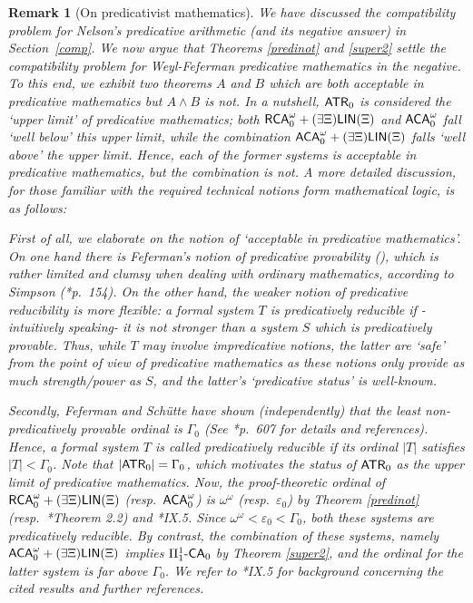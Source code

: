 \documentclass[reqno]{amsart}
\newtheorem{rem}[thm]{Remark}
\def\FIVE{\Pi_{1}^{1}\text{-\textup{\textsf{CA}}}_{0}}
\def\ATR{\textup{\textsf{ATR}}}
\def\RCAo{\textup{\textsf{RCA}}_{0}^{\omega}}
\def\ACAo{\textup{\textsf{ACA}}_{0}^{\omega}}
\def\LIN{\textup{\textsf{LIN}}}
\def\eps{\varepsilon}
\numberwithin{equation}{section}
\numberwithin{thm}{section}
\begin{document}
\begin{rem}[On predicativist mathematics]\label{predifiel}\rm
We have discussed the \emph{compatibility problem} for Nelson's predicative arithmetic (and its negative answer) in Section~\ref{comp}.  
We now argue that Theorems \ref{predinot} and \ref{super2} settle the compatibility problem for Weyl-Feferman predicative mathematics \emph{in the negative}.  
To this end, we exhibit two theorems $A$ and $B$ which are both \emph{acceptable} in predicative mathematics but $A\wedge B$ is not.  
In a nutshell, $\ATR_{0}$ is considered the `upper limit' of predicative mathematics; both $\RCAo+(\exists \Xi)\LIN(\Xi)$ and $\ACAo$ fall `well below' this upper limit, while the combination $\ACAo+(\exists \Xi)\LIN(\Xi)$ falls `well above' the upper limit.  Hence, each of the former systems is acceptable in predicative mathematics, but the combination is not.  
A more detailed discussion, for those familiar with the required technical notions form mathematical logic, is as follows:  

\smallskip

First of all, we elaborate on the notion of `acceptable in predicative mathematics'.
On one hand there is Feferman's notion of \emph{predicative provability} (\cite{fefermanga, fefermanmain}), 
which is rather limited and clumsy when dealing with ordinary mathematics, according to Simpson (\cite{simpsonfriedman}*{p.\ 154}).
On the other hand, the weaker notion of \emph{predicative reducibility} is more flexible: a formal system $T$ is \emph{predicatively reducible} 
if -intuitively speaking- it is not stronger than a system $S$ which is predicatively provable.  
Thus, while $T$ may involve \emph{impredicative} notions, the latter are `safe' from the point of view of predicative mathematics as these notions only provide as much strength/power as $S$, and the latter's `predicative status' is well-known.    

\smallskip

Secondly, Feferman and Sch\"utte have shown (independently) that the least \emph{non-predicatively provable} ordinal is $\Gamma_{0}$ (See \cite{fefermanmain}*{p.\ 607} for details and references).  Hence, a formal system $T$ is called \emph{predicatively reducible} if its ordinal $|T|$ satisfies $|T|<\Gamma_{0}$.   
Note that $|\ATR_{0}|=\Gamma_{0}$, which motivates the status of $\ATR_{0}$ as the upper limit of predicative mathematics.  
Now, the proof-theoretic ordinal of $\RCAo+(\exists \Xi)\LIN(\Xi)$ (resp.\ $\ACAo$) is $\omega^{\omega}$ (resp.\ $\eps_{0}$) by Theorem \ref{predinot} (resp.\ \cite{yamayamaharehare}*{Theorem 2.2}) and \cite{simpson2}*{IX.5}.
Since $\omega^{\omega}<\eps_{0}<\Gamma_{0}$, both these systems are predicatively reducible.  
By contrast, the combination of these systems, namely $\ACAo+(\exists \Xi)\LIN(\Xi)$ implies $\FIVE$ by Theorem \ref{super2}, and the ordinal for the latter system is far above $\Gamma_{0}$.  
We refer to \cite{simpson2}*{IX.5} for background concerning the cited results and further references.  
\end{rem}
\end{document}
